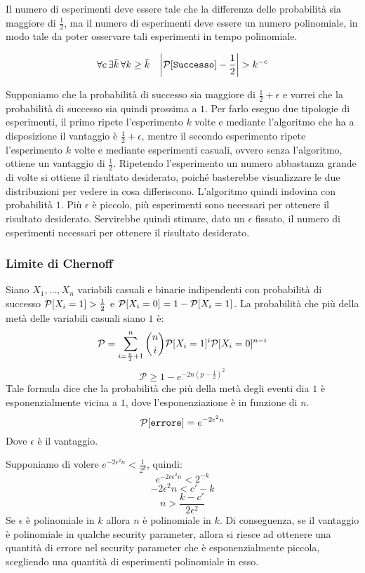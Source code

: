 Il numero di esperimenti deve essere tale che la differenza delle probabilità sia
maggiore di $\frac{1}{2}$, ma il numero di esperimenti deve essere un numero 
polinomiale, in modo tale da poter osservare tali esperimenti in tempo polinomiale.
\begin{tcolorbox}[title = Sicurezza]
  \begin{equation}
    \forall c \, \exists \bar{k} \, \forall k \geq \bar{k} \quad \bigg| \text{$\mathcal{P}$}[\texttt{Successo}] - \frac{1}{2}  \bigg|  > k^{-c}
  \end{equation}
\end{tcolorbox}
Supponiamo che la probabilità di successo sia maggiore di $\frac{1}{2} + \epsilon$ e vorrei che la probabilità di successo sia quindi 
prossima a $1$. Per farlo eseguo due tipologie di esperimenti, il primo ripete l'esperimento $k$ volte e mediante l'algoritmo che 
ha a disposizione il vantaggio è $\frac{1}{2} + \epsilon$, mentre il secondo esperimento ripete l'esperimento $k$ volte e mediante
esperimenti casuali, ovvero senza l'algoritmo, ottiene un vantaggio di $\frac{1}{2}$. Ripetendo l'esperimento un numero abbastanza grande di 
volte si ottiene il risultato desiderato, poiché basterebbe visualizzare le due distribuzioni per vedere in cosa differiscono. L'algoritmo 
quindi indovina con probabilità $1$. Più $\epsilon$ è piccolo, più esperimenti sono necessari per ottenere il risultato desiderato. 
Servirebbe quindi stimare, dato un $\epsilon$ fissato, il numero di esperimenti necessari per ottenere il risultato desiderato.
\subsubsection{Limite di Chernoff} \label{limite_chernoff}
\begin{tcolorbox}[title = Limite di Chernoff]
  Siano $X_1, \dots, X_n$ variabili casuali e binarie indipendenti con probabilità 
  di successo $\text{$\mathcal{P}$}[X_i = 1] > \frac{1}{2}$ e $\text{$\mathcal{P}$}[X_i = 0] = 1 - \text{$\mathcal{P}$}[X_i = 1]$.
  La probabilità che più della metà delle variabili casuali siano $1$ è:
  \[
    \mathcal{P} = \sum_{i = \frac{n}{2} + 1}^n \binom{n}{i} \text{$\mathcal{P}$}[X_i = 1]^i \text{$\mathcal{P}$}[X_i = 0]^{n - i}
  \]
  \[
    \mathcal{P} \geq 1 - e^{-2n\left(p - \frac{1}{2}\right)^2}
  \]
  Tale formula dice che la probabilità che più della metà degli eventi dia $1$ è 
  esponenzialmente vicina a $1$, dove l'esponenziazione è in funzione di $n$.
  \[
    \text{$\mathcal{P}$}[\texttt{errore}] = e^{-2 \epsilon^2 n}
  \]
  Dove $\epsilon$ è il vantaggio.
\end{tcolorbox}
Supponiamo di volere $e^{-2 \epsilon^2 n} < \frac{1}{2^k}$, quindi:
\[
  e^{-2c\epsilon^2 n} < 2^{-k}
\]
\[
  -2\epsilon^2 n < c' - k 
\]
\[
  n > \frac{k - c'}{2\epsilon^2}
\]
Se $\epsilon$ è polinomiale in $k$ allora $n$ è polinomiale in $k$.
Di conseguenza, se il vantaggio è polinomiale in qualche security parameter, allora
si riesce ad ottenere una quantità di errore nel security parameter che è
esponenzialmente piccola, scegliendo una quantità di esperimenti polinomiale in esso.

